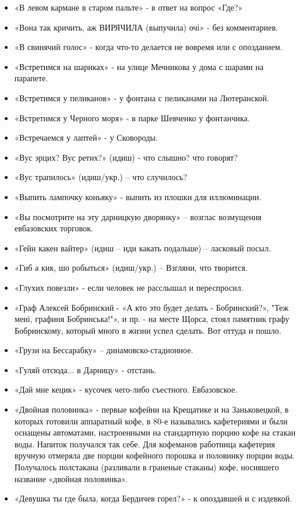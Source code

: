 \begin{itemize}
\item  «В левом кармане в старом пальте» - в ответ на вопрос «Где?»
\item  «Вона так кричить, аж ВИРЯЧИЛА (выпучила) очі» - без комментариев.
\item  «В свинячий голос» - когда что-то делается не вовремя или с опозданием.
\item  «Встретимся на шариках» - на улице Мечникова у дома с шарами на парапете. 
\item  «Встретимся у пеликанов» - у фонтана с пеликанами  на Лютеранской.
\item  «Встретимся у Черного моря» - в парке Шевченко у фонтанчика.
\item  «Встречаемся у лаптей» - у Сковороды.
\item  «Вус эрцих? Вус ретих?» (идиш) - что слышно? что говорят?
\item  «Вус трапилось» (идиш/укр.) – что случилось?
\item  «Выпить лампочку коньяку» - выпить из плошки для иллюминации.
\item  «Вы посмотрите на эту дарницкую дворянку» – возглас возмущения евбазовских торговок.
\item  «Гейн какен вайтер» (идиш – иди какать подальше) – ласковый посыл.
\item  «Гиб а кик, шо робыться» (идиш/укр.) – Взгляни, что творится.
\item  «Глухих повезли» - если человек не расслышал и переспросил.
\item  «Граф Алексей Бобринский - «А кто это будет делать - Бобринский?», "Теж мені, графиня Бобринська!"», и пр. - на месте Щорса, стоял памятник графу Бобринскому, который много в жизни успел сделать. Вот оттуда и пошло.
\item  «Грузи на Бессарабку» – динамовско-стадионное.
\item  «Гуляй отсюда... в Дарницу» - отстань.
\item  «Дай мне кецик» - кусочек чего-либо съестного. Евбазовское.
\item  «Двойная половинка» - первые кофейни на Крещатике и на Заньковецкой, в которых готовили аппаратный кофе, в 80-е назывались кафетериями и были оснащены автоматами, настроенными на стандартную порцию кофе на стакан воды. Напиток получался так себе. Для кофеманов работница кафетерия вручную отмеряла две порции кофейного порошка и половинку порции воды. Получалось полстакана (разливали в граненые стаканы) кофе, носившего название «двойная половинка».
\item  «Девушка ты где была, когда Бердичев горел?» - к опоздавшей и с издевкой.

\end{itemize}
